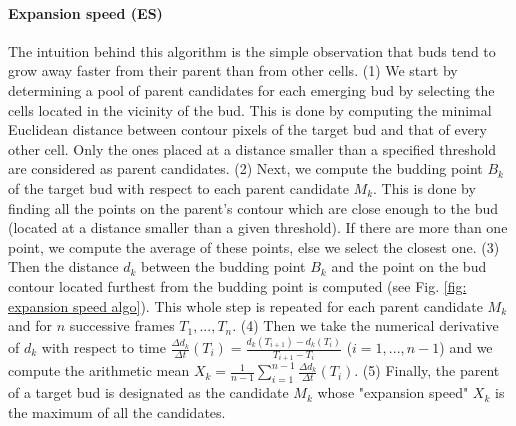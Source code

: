 \documentclass{TP}
\begin{document}
\paragraph{Expansion speed (ES)} 
The intuition behind this algorithm is the simple observation that buds tend to grow away faster from their parent than from other cells. (1) We start by determining a pool of parent candidates for each emerging bud by selecting the cells located in the vicinity of the bud. This is done by computing the minimal Euclidean distance between contour pixels of the target bud and that of every other cell. Only the ones placed at a distance smaller than a specified threshold are considered as parent candidates. (2) Next, we compute the budding point $B_k$ of the target bud with respect to each parent candidate $M_k$. This is done by finding all the points on the parent's contour which are close enough to the bud (located at a distance smaller than a given threshold). If there are more than one point, we compute the average of these points, else we select the closest one. (3) Then the distance $d_k$ between the budding point $B_k$ and the point on the bud contour located furthest from the budding point is computed (see Fig. \ref{fig: expansion speed algo}). This whole step is repeated for each parent candidate $M_k$ and for $n$ successive frames $T_1,...,T_n$. (4) Then we take the numerical derivative of $d_k$ with respect to time $\frac{\Delta d_k}{\Delta t}(T_i) = \frac{d_k(T_{i+1}) - d_k(T_{i})}{T_{i+1} - T_i}$ ($i=1,...,n-1$) and we compute the arithmetic mean $X_k = \frac{1}{n-1}\sum_{i=1}^{n-1} \frac{\Delta d_k}{\Delta t}(T_i)$. (5) Finally,  the  parent  of a target bud is designated as the candidate  $M_k$  whose "expansion speed" $X_k$  is  the  maximum  of  all  the  candidates. 
\end{document}
